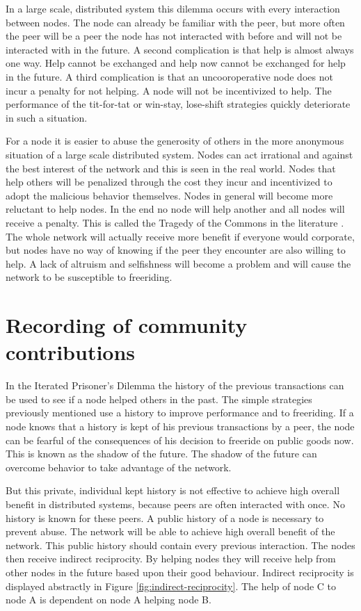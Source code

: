 In a large scale, distributed system this dilemma occurs with every interaction between nodes.
The node can already be familiar with the peer,
but more often the peer will be a peer the node has not interacted with before
and will not be interacted with in the future.
A second complication is that help is almost always one way.
Help cannot be exchanged and help now cannot be exchanged for help in the future\cite{Lai-Incentives}.
A third complication is that an uncooroperative node does not incur a penalty for not helping.
A node will not be incentivized to help.
The performance of the tit-for-tat or win-stay, lose-shift strategies
quickly deteriorate in such a situation.

For a node it is easier to abuse the generosity of others in the more anonymous situation of a large scale distributed system.
Nodes can act irrational and against the best interest of the network
and this is seen in the real world\cite{Adar-Freeriding}.
Nodes that help others will be penalized through the cost they incur
and incentivized to adopt the malicious behavior themselves.
Nodes in general will become more reluctant to help nodes\cite{Nowak-PrisonerDilemma}.
In the end no node will help another and all nodes will receive a penalty.
This is called the Tragedy of the Commons in the literature \cite{Hardin-Tragedy}.
The whole network will actually receive more benefit if everyone would corporate,
but nodes have no way of knowing if the peer they encounter are also willing to help.
A lack of altruism and selfishness will become a problem 
and will cause the network to be susceptible to freeriding.

\section{Recording of community contributions}
In the Iterated Prisoner's Dilemma the history of the previous transactions can be used 
to see if a node helped others in the past.
The simple strategies previously mentioned use a history to improve performance
and to freeriding.
If a node knows that a history is kept of his previous transactions by a peer,
the node can be fearful of the consequences of his decision to freeride on public goods now.
This is known as the shadow of the future\cite{bo-shadow}.
The shadow of the future can overcome behavior to take advantage of the network.

But this private, individual kept history is not effective
to achieve high overall benefit in distributed systems\cite{Lai-Incentives},
because peers are often interacted with once.
No history is known for these peers.
A public history of a node is necessary to prevent abuse.
The network will be able to achieve high overall benefit of the network\cite{Lai-Incentives}.
This public history should contain every previous interaction.
The nodes then receive indirect reciprocity\cite{Nowak-Cooperation}.
By helping nodes they will receive help from other nodes in the future based upon their good behaviour.
Indirect reciprocity is displayed abstractly in Figure \ref{fig:indirect-reciprocity}.
The help of node C to node A is dependent on node A helping node B.

